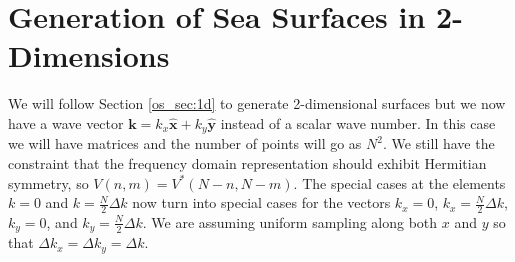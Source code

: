 \section{Generation of Sea Surfaces in 2-Dimensions}
We will follow Section \ref{os_sec:1d} to generate 2-dimensional surfaces but we now have a wave vector $\mathbf{k} = k_x\hat{\mathbf{x}} + k_y\hat{\mathbf{y}}$ instead of a scalar wave number. In this case we will have matrices and the number of points will go as $N^2$. We still have the constraint that the frequency domain representation should exhibit Hermitian symmetry, so $V(n,m) = V^*(N-n,N-m)$. The special cases at the elements $k = 0$ and $k = \frac{N}{2}\Delta k$ now turn into special cases for the vectors $k_x = 0$, $k_x = \frac{N}{2}\Delta k$, $k_y = 0$, and $k_y = \frac{N}{2}\Delta k$. We are assuming uniform sampling along both $x$ and $y$ so that $\Delta k_x = \Delta k_y = \Delta k$.

